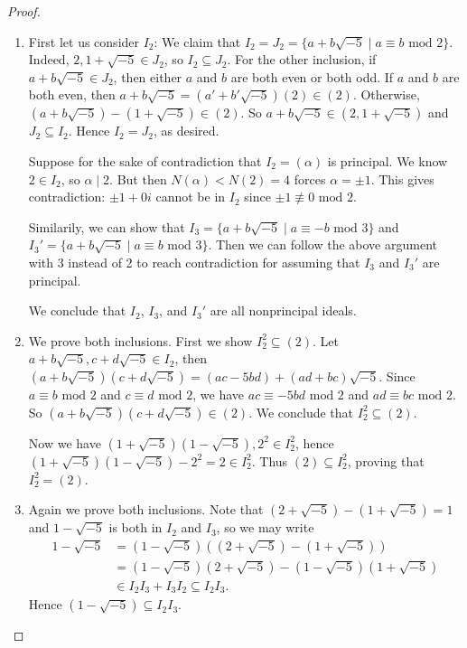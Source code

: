 \documentclass[12pt]{article}
\theoremstyle{remark}
\theoremstyle{named}
\renewcommand{\a}{\alpha}
\renewcommand{\mod}{\text{ mod }}
\begin{document}
\begin{proof}
    \hspace*{0in}
    \begin{enumerate}
        \item First let us consider \(I_2\): We claim that \(I_2 = J_2 = \{a + b\sqrt{-5} \mid a \equiv b \mod 2\}\). Indeed, \(2, 1 + \sqrt{-5} \in J_2\), so \(I_2 \subseteq J_2\). For the other inclusion, if \(a + b\sqrt{-5} \in J_2\), then either \(a\) and \(b\) are both even or both odd. If \(a\) and \(b\) are both even, then \(a + b\sqrt{-5} = (a' + b'\sqrt{-5})(2) \in (2)\). Otherwise, \((a + b\sqrt{-5}) - (1 + \sqrt{-5}) \in (2)\). So \(a + b\sqrt{-5} \in (2, 1 + \sqrt{-5})\) and \(J_2 \subseteq I_2\). Hence \(I_2 = J_2\), as desired.
        
        Suppose for the sake of contradiction that \(I_2 = (\a)\) is principal. We know \(2 \in I_2\), so \(\a \mid 2\). But then \(N(\a) < N(2) = 4\) forces \(\a = \pm 1\). This gives contradiction: \(\pm 1 + 0i\) cannot be in \(I_2\) since \(\pm 1 \not\equiv 0 \mod 2\). 

        Similarily, we can show that \(I_3 = \{a + b\sqrt{-5} \mid a \equiv -b \mod 3\}\) and \(I_3' = \{a + b\sqrt{-5} \mid a \equiv b \mod 3\}\). Then we can follow the above argument with \(3\) instead of 2 to reach contradiction for assuming that \(I_3\) and \(I_3'\) are principal. 

        We conclude that \(I_2\), \(I_3\), and \(I_3'\) are all nonprincipal ideals.
        \item We prove both inclusions. First we show \(I_2^2 \subseteq (2)\). Let \(a + b\sqrt{-5}, c + d\sqrt{-5} \in I_2\), then \((a + b\sqrt{-5})(c + d\sqrt{-5}) = (ac - 5bd) + (ad + bc)\sqrt{-5}\). Since \(a \equiv b \mod 2\) and \(c \equiv d \mod 2\), we have \(ac \equiv -5bd \mod 2\) and \(ad \equiv bc \mod 2\). So \((a + b\sqrt{-5})(c + d\sqrt{-5}) \in (2)\). We conclude that \(I_2^2 \subseteq (2)\). 
        
        Now we have \((1 + \sqrt{-5})(1 - \sqrt{-5}), 2^2 \in I_2^2\), hence \((1 + \sqrt{-5})(1 - \sqrt{-5}) - 2^2 = 2 \in I_2^2\). Thus \((2) \subseteq I_2^2\), proving that \(I_2^2 = (2)\). 
        \item Again we prove both inclusions. Note that \((2 + \sqrt{-5}) - (1 + \sqrt{-5}) = 1\) and \(1 - \sqrt{-5}\) is both in \(I_2\) and \(I_3\), so we may write 
        \begin{align*}
            1 - \sqrt{-5} &= (1 - \sqrt{-5})((2 + \sqrt{-5}) - (1 + \sqrt{-5})) \\
            &= (1 - \sqrt{-5})(2 + \sqrt{-5}) - (1 - \sqrt{-5})(1 + \sqrt{-5}) \\
            &\in I_2 I_3 + I_3 I_2 \subseteq I_2 I_3.
        \end{align*}
        Hence \((1 - \sqrt{-5}) \subseteq I_2 I_3\).
        

\end{enumerate}
\end{proof}
\end{document}
